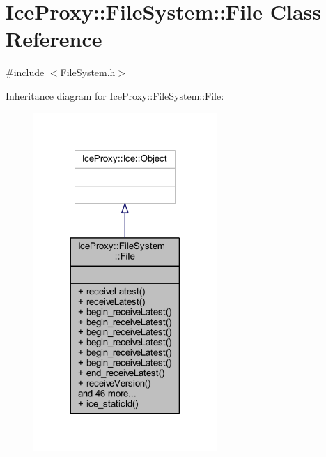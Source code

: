 \hypertarget{class_ice_proxy_1_1_file_system_1_1_file}{}\section{Ice\+Proxy\+:\+:File\+System\+:\+:File Class Reference}
\label{class_ice_proxy_1_1_file_system_1_1_file}


{\ttfamily \#include $<$File\+System.\+h$>$}



Inheritance diagram for Ice\+Proxy\+:\+:File\+System\+:\+:File\+:
\nopagebreak
\begin{figure}[H]
\begin{center}
\leavevmode
\includegraphics[width=197pt]{class_ice_proxy_1_1_file_system_1_1_file__inherit__graph}
\end{center}
\end{figure}


